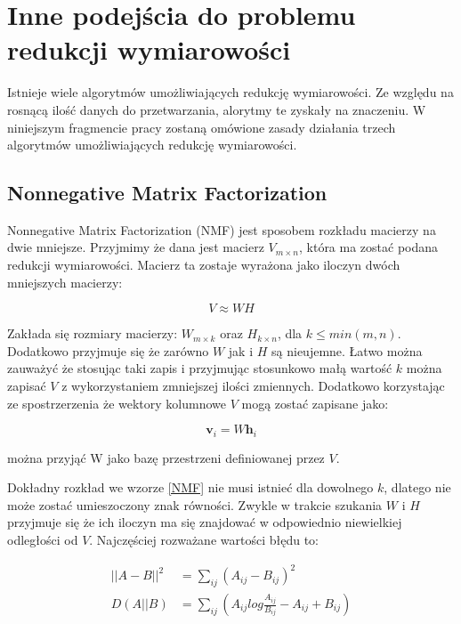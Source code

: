 \documentclass[oneside, eng]{mgr}
\newcommand{\bb}{\textbf}
\begin{document}
\section{Inne podejścia do problemu redukcji wymiarowości}
Istnieje wiele algorytmów umożliwiających redukcję wymiarowości. Ze względu na rosnącą ilość danych do przetwarzania, alorytmy te zyskały na znaczeniu. W niniejszym fragmencie pracy zostaną omówione zasady działania trzech algorytmów umożliwiających redukcję wymiarowości.

\subsection{Nonnegative Matrix Factorization}

Nonnegative Matrix Factorization (NMF) jest sposobem rozkładu macierzy na dwie mniejsze. Przyjmimy że dana jest macierz $V_{m \times n}$, która ma zostać podana redukcji wymiarowości. Macierz ta zostaje wyrażona jako iloczyn dwóch mniejszych macierzy:

\begin{equation}
	V \approx WH
\label{NMF}
\end{equation}

Zakłada się rozmiary macierzy: $W_{m \times k}$ oraz $H_{k \times n}$, dla $k \leq min(m,n)$. Dodatkowo przyjmuje się że zarówno $W$ jak i $H$ są nieujemne. Łatwo można zauważyć że stosując taki zapis i przyjmując stosunkowo małą wartość $k$ można zapisać $V$ z wykorzystaniem zmniejszej ilości zmiennych. Dodatkowo korzystając ze spostrzerzenia że wektory kolumnowe $V$ mogą zostać zapisane jako:

\begin{equation}
	\bb{v}_i = W \bb{h}_i
\end{equation}

można przyjąć W jako bazę przestrzeni definiowanej przez $V$.

Dokładny rozkład we wzorze \ref{NMF} nie musi istnieć dla dowolnego $k$, dlatego nie może zostać umieszoczony znak równości. Zwykle w trakcie szukania $W$ i $H$ przyjmuje się że ich iloczyn ma się znajdować w odpowiednio niewielkiej odległości od $V$. Najczęściej rozważane wartości błędu to:

\begin{align*}
	||A - B||^2 &= \sum_{ij} (A_{ij} - B_{ij})^2 \\
	  D(A||B)   &= \sum_{ij} (A_{ij} log \frac{A_{ij}}{B_{ij}} - A_{ij} + B_{ij})
\end{align*}
\end{document}
